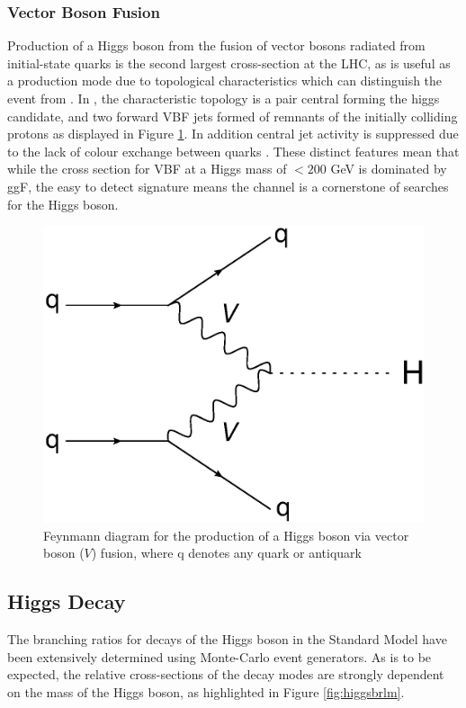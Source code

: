 		\subsubsection{Vector Boson Fusion}
		
			Production of a Higgs boson from the fusion of vector bosons radiated from initial-state quarks is the second largest cross-section at the LHC, as is useful as a production mode due to topological characteristics which can distinguish the event from \ggF. In \VBFHBB, the characteristic topology is a pair central \bjets forming the higgs candidate, and two forward VBF jets formed of remnants of the initially colliding protons as displayed in Figure \ref{fig:T:vbf}. In addition central jet activity is suppressed due to the lack of colour exchange between quarks \cite{VBF2004}.  These distinct features mean that while the cross section for VBF at a Higgs mass of $< 200$ GeV is dominated by ggF, the easy to detect signature means the channel is a cornerstone of searches for the Higgs boson.
		
			\begin{figure}[h]
				\centering
				\includegraphics[width=0.4\linewidth]{T/FIGS/vbf}
				\caption{Feynmann diagram for the production of a Higgs boson via vector boson ($V$) fusion, where q denotes any quark or antiquark}
				\label{fig:T:vbf}
			\end{figure}
				
	\subsection{Higgs Decay} 
	
		The branching ratios for decays of the Higgs boson in the Standard Model have been extensively determined using Monte-Carlo event generators. As is to be expected, the relative cross-sections of the decay modes are strongly dependent on the mass of the Higgs boson, as highlighted in Figure \ref{fig:higgsbrlm}. 
	
